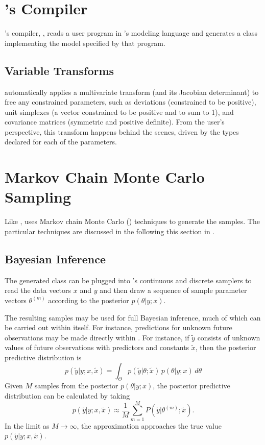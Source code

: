 \section{\Stan's Compiler}

\Stan's compiler, \stanc, reads a user program in \Stan's modeling
language and generates a \Cpp class implementing the model specified
by that program.  

\subsection{Variable Transforms}

\Stan automatically applies a multivariate transform (and its Jacobian
determinant) to free any constrained parameters, such as deviations
(constrained to be positive), unit simplexes (a vector constrained to
be positive and to sum to 1), and covariance matrices (symmetric and
positive definite).  From the user's perspective, this 
transform happens behind the scenes, driven by the types declared for 
each of the parameters. 

\section{Markov Chain Monte Carlo Sampling}

Like \BUGS, \Stan uses Markov chain Monte Carlo (\MCMC) techniques to
generate the samples.  The particular techniques are discussed in the
following this section in .

\subsection{Bayesian Inference}

The generated \Cpp class can be plugged into \Stan's continuous and
discrete samplers to read the data vectors $x$ and $y$ and then draw a
sequence of sample parameter vectors $\theta^{(m)}$ according to the
posterior $p(\theta|y;x)$.  

The resulting samples may be used for full Bayesian inference, much of
which can be carried out within \Stan itself.  For instance,
predictions for unknown future observations may be made directly
within \Stan.  For instance, if $\tilde{y}$ consists of unknown values
of future observations with predictors and constants $\tilde{x}$, then
the posterior predictive distribution is
%
\[
p(\tilde{y}|y;x,\tilde{x})
= \int_\Theta p(\tilde{y}|\theta;\tilde{x})
  \, p(\theta|y;x) \, d\theta
\]
%
Given $M$ samples from the posterior $p(\theta|y;x)$, the posterior
predictive distribution can be calculated by taking
\[
p(\tilde{y}|y;x,\tilde{x})
\approx
\frac{1}{M} \sum_{m=1}^M P(\tilde{y}|\theta^{(m)};\tilde{x}).
\]
%
In the limit as $M \rightarrow \infty$, the approximation approaches
the true value $p(\tilde{y}|y;x,\tilde{x})$.

